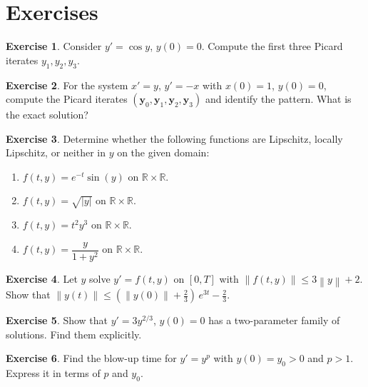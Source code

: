 \documentclass[12pt,a4paper,openany]{book}
\theoremstyle{definition}
\newtheorem{exercise}{Exercise}[chapter]
\theoremstyle{plain}
\theoremstyle{remark}
\newcommand{\R}{\mathbb{R}}
\newcommand{\abs}[1]{\left|#1\right|}
\newcommand{\norm}[1]{\left\|#1\right\|}
\begin{document}
\section{Exercises}\label{sec:ch3-exercises}

\begin{exercise}\label{exer:picard-sinusoidal}
Consider $y' = \cos y$, $y(0) = 0$. Compute the first three Picard iterates
$y_1, y_2, y_3$.
\end{exercise}

\begin{exercise}\label{exer:picard-2d}
For the system $x' = y$, $y' = -x$ with $x(0) = 1$, $y(0) = 0$, compute the
Picard iterates $(\mathbf{y}_0, \mathbf{y}_1, \mathbf{y}_2, \mathbf{y}_3)$
and identify the pattern. What is the exact solution?
\end{exercise}

\begin{exercise}\label{exer:lipschitz-verify}
Determine whether the following functions are Lipschitz, locally Lipschitz, or
neither in $y$ on the given domain:
\begin{enumerate}[label=(\alph*)]
  \item $f(t,y) = e^{-t}\sin(y)$ on $\R \times \R$.
  \item $f(t,y) = \sqrt{\abs{y}}$ on $\R \times \R$.
  \item $f(t,y) = t^2 y^3$ on $\R \times \R$.
  \item $f(t,y) = \dfrac{y}{1+y^2}$ on $\R \times \R$.
\end{enumerate}
\end{exercise}

\begin{exercise}\label{exer:gronwall-application}
Let $y$ solve $y' = f(t,y)$ on $[0,T]$ with $\norm{f(t,y)} \le 3\norm{y} + 2$.
Show that $\norm{y(t)} \le (\norm{y(0)} + \tfrac{2}{3})\,e^{3t} - \tfrac{2}{3}$.
\end{exercise}

\begin{exercise}\label{exer:uniqueness-failure}
Show that $y' = 3y^{2/3}$, $y(0) = 0$ has a two-parameter family of solutions.
Find them explicitly.
\end{exercise}

\begin{exercise}\label{exer:blow-up-time}
Find the blow-up time for $y' = y^p$ with $y(0) = y_0 > 0$ and $p > 1$.
Express it in terms of $p$ and $y_0$.
\end{exercise}
\end{document}
